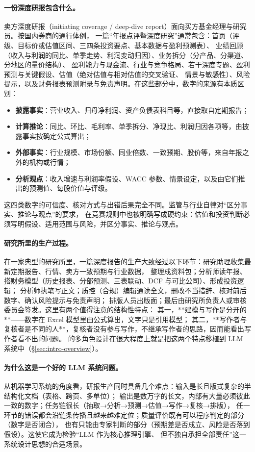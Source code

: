 \paragraph{一份深度研报包含什么。}
卖方深度研报（initiating coverage / deep-dive report）面向买方基金经理与研究员。按国内券商的通行体例，
一篇“年报点评暨深度研究”通常包含：首页（评级、目标价或估值区间、三四条投资要点、基本数据与盈利预测表）、
业绩回顾（收入与利润的同比、单季走势、利润变动归因）、业务拆分（分产品、分渠道、分地区的量价结构）、
盈利能力与现金流、行业与竞争格局、若干深度专题、盈利预测与关键假设、估值（绝对估值与相对估值的交叉验证、
情景与敏感性）、风险提示，以及财务报表预测附录与免责声明。在这些部分中，数字的来源有本质区别：
\begin{itemize}
  \item \textbf{披露事实}：营业收入、归母净利润、资产负债表科目等，直接取自定期报告；
  \item \textbf{计算推论}：同比、环比、毛利率、单季拆分、净现比、利润归因各项等，由披露事实按确定公式算出；
  \item \textbf{外部事实}：行业规模、市场份额、同业倍数、一致预期、股价等，来自年报之外的机构或行情；
  \item \textbf{分析观点}：收入增速与利润率假设、WACC 参数、情景设定，以及由它们推出的预测值、每股价值与评级。
\end{itemize}
这四类数字的可信度、核对方式与出错后果完全不同。监管与行业自律对“区分事实、推论与观点”的要求，
在竞赛规则中也被明确写成硬约束：估值和投资判断必须写明假设、适用范围与风险，并区分事实、推论与观点。

\paragraph{研究所里的生产过程。}
在一家典型的研究所里，一篇深度报告的生产大致经过以下环节：研究助理收集最新定期报告、行情、卖方一致预期与行业数据，
整理成资料包；分析师读年报、搭财务模型（历史报表、分部预测、三表联动、DCF 与可比公司）、形成投资逻辑；
分析师执笔写正文；质控（合规）编辑通读全文，删改不当措辞、核对前后数字、确认风险提示与免责声明；
排版人员出版面；最后由研究所负责人或审核委员会签发。这里有两个值得注意的结构性特点：
其一，**建模与写作是分开的**——数字在 Excel 模型里由公式算出，文字只是引用模型；
其二，**写作者与复核者是不同的人**，复核者没有参与写作，不继承写作者的思路，因而能看出写作者看不出的问题。
\sysname{} 的多角色设计在很大程度上就是把这两个特点移植到 LLM 系统中（\S\ref{sec:intro-overview}）。

\paragraph{为什么这是一个好的 LLM 系统问题。}
从机器学习系统的角度看，研报生产同时具备几个难点：输入是长且版式复杂的半结构化文档（表格、跨页、多单位）；
输出是数万字的长文，内部有大量必须彼此一致的数字；任务链很长（抽取→分析→预测→估值→写作→复核→排版），
任一环节的错误都会沿链条传播且越来越难定位；质量评价既有可以程序判定的部分（数字是否闭合），
也有只能由专家判断的部分（预期差是否成立、风险是否落到假设）。这使它成为检验“LLM 作为核心推理引擎、
但不独自承担全部责任”这一系统设计思想的合适场景。

